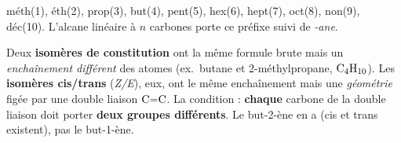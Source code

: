 \documentclass[11pt,a4paper]{article}
\begin{document}
\begin{methode}
méth(1), éth(2), prop(3), but(4), pent(5), hex(6), hept(7), oct(8), non(9), déc(10). L'alcane linéaire à $n$ carbones porte ce préfixe suivi de \textit{-ane}.
\end{methode}

\begin{piege}
Deux \textbf{isomères de constitution} ont la même formule brute mais un \emph{enchaînement différent} des atomes (ex.\ butane et 2-méthylpropane, $\ce{C4H10}$). Les \textbf{isomères cis/trans} (\emph{Z/E}), eux, ont le même enchaînement mais une \emph{géométrie} figée par une double liaison $\ce{C=C}$. La condition : \textbf{chaque} carbone de la double liaison doit porter \textbf{deux groupes différents}. Le but-2-ène en a (cis et trans existent), pas le but-1-ène.
\end{piege}
\end{document}
